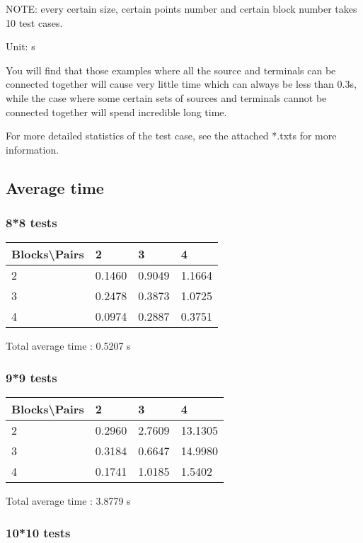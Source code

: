 \documentclass[12pt, a4paper]{article}
\begin{document}
		NOTE: every certain size, certain points number and certain block number takes 10 test cases.

		Unit: s

		You will find that those examples where all the source and terminals can be connected together will cause very little time which can always be less than 0.3s, while the case where some certain sets of sources and terminals cannot be connected together will spend incredible long time.

		For more detailed statistics of the test case, see the attached *.txts for more information.

		
		\subsection{Average time}

			\subsubsection{8*8 tests}

				\begin{tabular}[h]{|l|l|l|l|}
				\hline
				Blocks\textbackslash Pairs & 2 & 3 & 4 \\
				\hline
				2 & 0.1460 & 0.9049 & 1.1664 \\
				\hline
				3 & 0.2478 & 0.3873 & 1.0725 \\
				\hline
				4 & 0.0974 & 0.2887 & 0.3751 \\
				\hline
				\end{tabular}

				Total average time : 0.5207 s

			\subsubsection{9*9 tests}

				\begin{tabular}[h]{|l|l|l|l|}
				\hline
				Blocks\textbackslash Pairs & 2 & 3 & 4 \\
				\hline
				2 & 0.2960 & 2.7609 & 13.1305 \\
				\hline
				3 & 0.3184 & 0.6647 & 14.9980 \\
				\hline
				4 & 0.1741 & 1.0185 & 1.5402 \\
				\hline
				\end{tabular}

				Total average time : 3.8779 s

			\subsubsection{10*10 tests}
\end{document}
